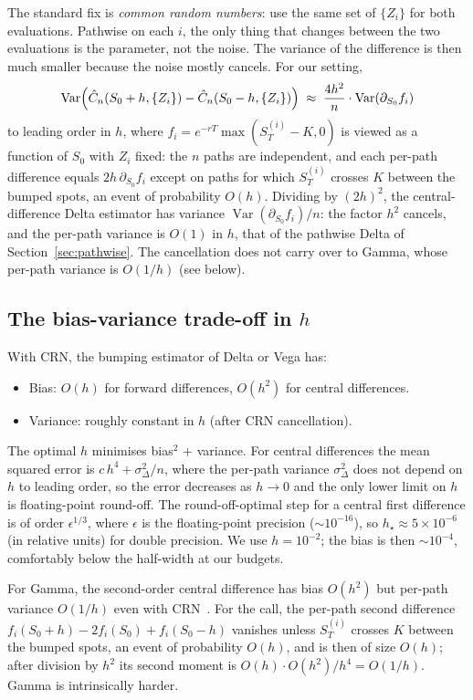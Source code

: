 \documentclass[11pt,a4paper]{article}
\theoremstyle{plain}
\theoremstyle{definition}
\theoremstyle{remark}
\newcommand{\Var}{\operatorname{Var}}
\begin{document}
The standard fix is \emph{common random numbers}: use the same set
of $\{Z_i\}$ for both evaluations. Pathwise on each $i$, the only
thing that changes between the two evaluations is the parameter,
not the noise. The variance of the difference is then much smaller
because the noise mostly cancels. For our setting,
\begin{equation}
\Var\Bigl(\hat C_n(S_0 + h, \{Z_i\}) - \hat C_n(S_0 - h, \{Z_i\})\Bigr)
\;\approx\; \frac{4h^2}{n} \cdot \Var(\partial_{S_0} f_i)
\end{equation}
to leading order in $h$, where $f_i = e^{-rT}\max(S_T^{(i)} - K, 0)$
is viewed as a function of $S_0$ with $Z_i$ fixed: the $n$ paths are
independent, and each per-path difference equals
$2h\,\partial_{S_0} f_i$ except on paths for which $S_T^{(i)}$ crosses
$K$ between the bumped spots, an event of probability $O(h)$.
Dividing by $(2h)^2$, the central-difference Delta estimator has
variance $\Var(\partial_{S_0} f_i)/n$: the factor $h^2$ cancels, and
the per-path variance is $O(1)$ in $h$, that of the pathwise Delta of
Section~\ref{sec:pathwise}. The cancellation does not carry over to
Gamma, whose per-path variance is $O(1/h)$ (see below).

\subsection{The bias-variance trade-off in $h$}

With CRN, the bumping estimator of Delta or Vega has:
\begin{itemize}
\item Bias: $O(h)$ for forward differences, $O(h^2)$ for central
differences.
\item Variance: roughly constant in $h$ (after CRN cancellation).
\end{itemize}
The optimal $h$ minimises bias$^2$ + variance. For central
differences the mean squared error is $c\,h^4 + \sigma_\Delta^2/n$,
where the per-path variance $\sigma_\Delta^2$ does not depend on $h$
to leading order, so the error decreases as $h \to 0$ and the only
lower limit on $h$ is floating-point round-off. The round-off-optimal
step for a central first difference is of order $\epsilon^{1/3}$,
where $\epsilon$ is the floating-point precision ($\sim 10^{-16}$),
so $h_\star \approx 5 \times 10^{-6}$ (in relative units) for double
precision. We use $h = 10^{-2}$; the bias is
then $\sim 10^{-4}$, comfortably below the half-width at our
budgets.

For Gamma, the second-order central difference has bias $O(h^2)$
but per-path variance $O(1/h)$ even with
CRN~\cite[Section~7.1.2]{Glasserman}. For the call, the per-path
second difference $f_i(S_0 + h) - 2 f_i(S_0) + f_i(S_0 - h)$ vanishes
unless $S_T^{(i)}$ crosses $K$ between the bumped spots, an event of
probability $O(h)$, and is then of size $O(h)$; after division by
$h^2$ its second moment is $O(h) \cdot O(h^2)/h^4 = O(1/h)$. Gamma is
intrinsically harder.
\end{document}
